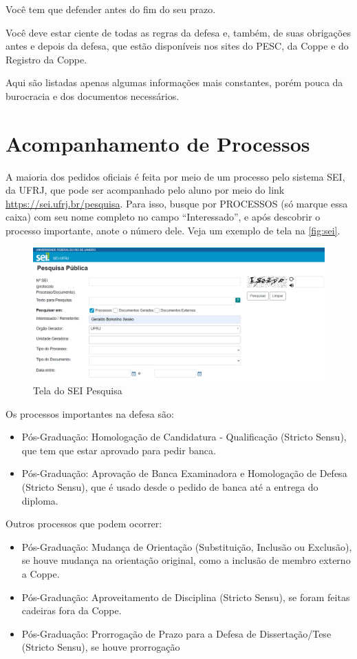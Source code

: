 Você tem que defender antes do fim do seu prazo. 

Você deve estar ciente de todas as regras da defesa e, também, de suas obrigações antes e depois da defesa, que estão disponíveis nos sites do PESC, da Coppe e do Registro da Coppe.

Aqui são listadas apenas algumas informações mais constantes, porém pouca da burocracia e dos documentos necessários.

\section{Acompanhamento de Processos}
A maioria dos pedidos oficiais é feita por meio de um processo pelo sistema SEI, da UFRJ, que pode ser acompanhado pelo aluno por meio do link \url{https://sei.ufrj.br/pesquisa}. Para isso, busque por PROCESSOS (só marque essa caixa) com seu nome completo no campo ``Interessado'', e após descobrir o processo importante, anote o número dele. Veja um exemplo de tela na \autoref{fig:sei}.

\begin{figure}[hbt]
    \centering
    \includegraphics[width=\linewidth]{Images/SEIPesquisa.png}
    \caption{Tela do SEI Pesquisa}
    \label{fig:sei}
\end{figure}

Os processos importantes na defesa são:
\begin{itemize}
    \item Pós-Graduação: Homologação de Candidatura - Qualificação (Stricto Sensu), que tem que estar aprovado para pedir banca.
    \item Pós-Graduação: Aprovação de Banca Examinadora e Homologação de Defesa (Stricto Sensu), que é usado desde o pedido de banca até a entrega do diploma.

\end{itemize}

Outros processos que podem ocorrer:
\begin{itemize}
    \item Pós-Graduação: Mudança de Orientação (Substituição, Inclusão ou Exclusão), se houve mudança na orientação original, como a inclusão de membro externo a Coppe.
    \item Pós-Graduação: Aproveitamento de Disciplina (Stricto Sensu), se foram feitas cadeiras fora da Coppe. 
        \item Pós-Graduação: Prorrogação de Prazo para a Defesa de Dissertação/Tese (Stricto Sensu), se houve prorrogação
\end{itemize}

